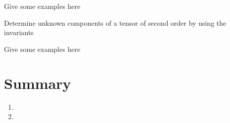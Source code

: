 Give some examples here

\begin{lo2}
\item Determine unknown components of a tensor of second order by using the invariants
\end{lo2}

Give some examples here

\section{Summary}

\begin{enumerate}
\item 
\item 
\end{enumerate}

